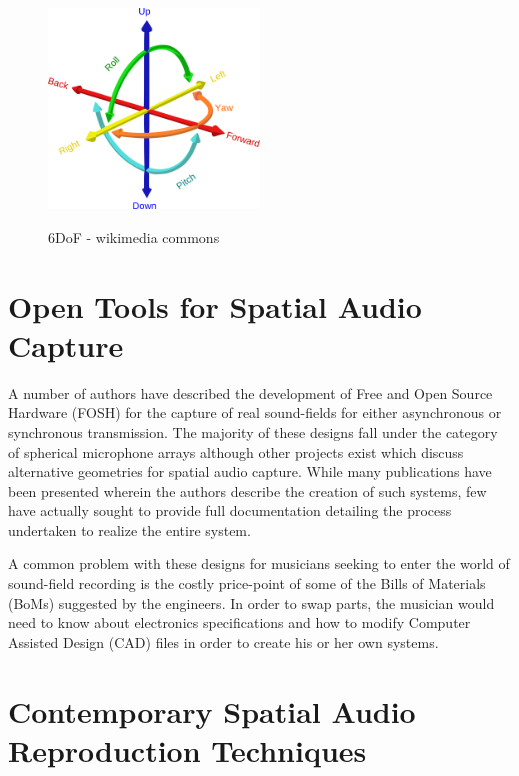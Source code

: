 \begin{figure}[h!]%
\centering
\includegraphics[width=0.5\textwidth]{img/6DOF.svg.png} 
\label{fig:6DoF}
\caption{6DoF - wikimedia commons}
\end{figure}

\section{Open Tools for Spatial Audio Capture}


A number of authors have described the development of Free and Open Source Hardware (FOSH) for the capture of real sound-fields for either asynchronous or synchronous transmission. The majority of these designs fall under the category of spherical microphone arrays although other projects exist which discuss alternative geometries for spatial audio capture. While many publications have been presented wherein the authors describe the creation of such systems, few have actually sought to provide full documentation detailing the process undertaken to realize the entire system. 

A common problem with these designs for musicians seeking to enter the world of sound-field recording is the costly price-point of some of the Bills of Materials (BoMs) suggested by the engineers. In order to swap parts, the musician would need to know about electronics specifications and how to modify Computer Assisted Design (CAD) files in order to create his or her own systems.

\section{Contemporary Spatial Audio Reproduction Techniques} \label{sec:contemp_audio_reproduction}

